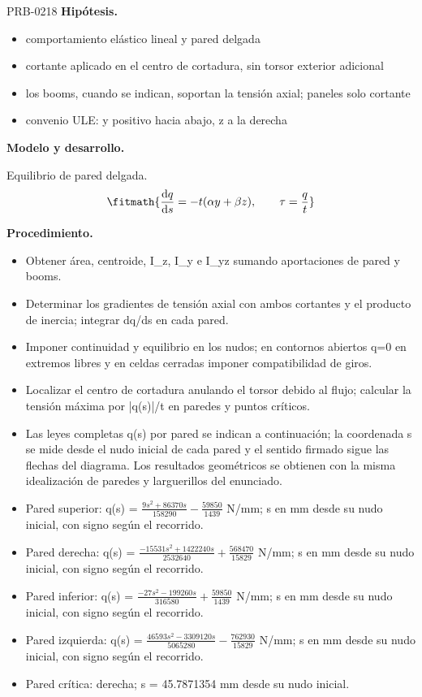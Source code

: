 \begin{studiumworked}{PRB-0218}
\textbf{Hipótesis.}\begin{itemize}\item comportamiento elástico lineal y pared delgada
\item cortante aplicado en el centro de cortadura, sin torsor exterior adicional
\item los booms, cuando se indican, soportan la tensión axial; paneles solo cortante
\item convenio ULE: y positivo hacia abajo, z a la derecha\end{itemize}

\textbf{Modelo y desarrollo.}

Equilibrio de pared delgada.\[\fitmath{\frac{\mathrm{d}q}{\mathrm{d}s}=-t(\alpha y+\beta z),\qquad \tau=\frac{q}{t}}\]

\textbf{Procedimiento.}\begin{itemize}\item Obtener área, centroide, I\_z, I\_y e I\_yz sumando aportaciones de pared y booms.
\item Determinar los gradientes de tensión axial con ambos cortantes y el producto de inercia; integrar dq/ds en cada pared.
\item Imponer continuidad y equilibrio en los nudos; en contornos abiertos q=0 en extremos libres y en celdas cerradas imponer compatibilidad de giros.
\item Localizar el centro de cortadura anulando el torsor debido al flujo; calcular la tensión máxima por |q(s)|/t en paredes y puntos críticos.
\item Las leyes completas q(s) por pared se indican a continuación; la coordenada s se mide desde el nudo inicial de cada pared y el sentido firmado sigue las flechas del diagrama. Los resultados geométricos se obtienen con la misma idealización de paredes y larguerillos del enunciado.
\item Pared superior: q(s) = $\frac{9 s^{2} + 86370 s}{158290} - \frac{59850}{1439}$ N/mm; s en mm desde su nudo inicial, con signo según el recorrido.
\item Pared derecha: q(s) = $\frac{- 15531 s^{2} + 1422240 s}{2532640} + \frac{568470}{15829}$ N/mm; s en mm desde su nudo inicial, con signo según el recorrido.
\item Pared inferior: q(s) = $\frac{- 27 s^{2} - 199260 s}{316580} + \frac{59850}{1439}$ N/mm; s en mm desde su nudo inicial, con signo según el recorrido.
\item Pared izquierda: q(s) = $\frac{46593 s^{2} - 3309120 s}{5065280} - \frac{762930}{15829}$ N/mm; s en mm desde su nudo inicial, con signo según el recorrido.
\item Pared crítica: derecha; s = 45.7871354 mm desde su nudo inicial.\end{itemize}


\end{studiumworked}
